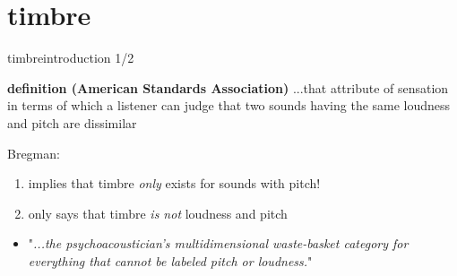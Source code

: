     \section{timbre}
        \begin{frame}{timbre}{introduction 1/2}
            \vspace{-3mm}
            \begin{block}{\textbf{definition (American Standards Association)}}
                ...that attribute of sensation in terms of which a listener can judge that two sounds having the same loudness and pitch are dissimilar
            \end{block}
            \bigskip
            Bregman:
                    \begin{enumerate}
                        \item   implies that timbre \textit{only} exists for sounds with pitch!
                        \item   only says that timbre \textit{is not} loudness and pitch
                    \end{enumerate}
            \pause
            
            \begin{itemize}
                \item[$\rightarrow$]   [timbre is] "\textit{...the psychoacoustician's multidimensional waste-basket category for everything that cannot be labeled pitch or loudness.}"
            \end{itemize}
        \end{frame}
        
